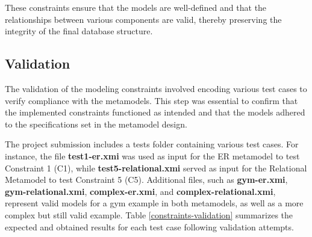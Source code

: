 \documentclass[10pt]{article}
\begin{document}
These constraints ensure that the models are well-defined and that the relationships between various components are valid, thereby preserving the integrity of the final database structure.

\subsection{Validation}

The validation of the modeling constraints involved encoding various test cases to verify compliance with the metamodels. This step was essential to confirm that the implemented constraints functioned as intended and that the models adhered to the specifications set in the metamodel design.

The project submission includes a tests folder containing various test cases. For instance, the file \textbf{test1-er.xmi} was used as input for the ER metamodel to test Constraint 1 (C1), while \textbf{test5-relational.xmi} served as input for the Relational Metamodel to test Constraint 5 (C5). Additional files, such as \textbf{gym-er.xmi}, \textbf{gym-relational.xmi}, \textbf{complex-er.xmi}, and \textbf{complex-relational.xmi}, represent valid models for a gym example in both metamodels, as well as a more complex but still valid example. Table \ref{constraints-validation} summarizes the expected and obtained results for each test case following validation attempts.
\end{document}
